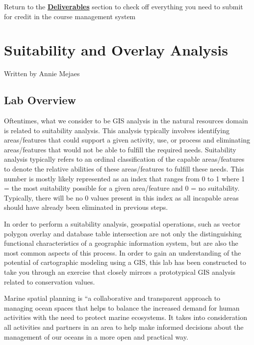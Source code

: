 \documentclass[
]{book}
\begin{document}
Return to the \protect\hyperlink{lab4-deliverables}{\textbf{Deliverables}} section to check off everything you need to submit for credit in the course management system

\hypertarget{suitability-overlay-analysis}{%
\chapter{Suitability and Overlay Analysis}\label{suitability-overlay-analysis}}

Written by
Annie Mejaes

\hypertarget{lab-overview-3}{%
\section*{Lab Overview}\label{lab-overview-3}}

Oftentimes, what we consider to be GIS analysis in the natural resources domain is related to suitability analysis. This analysis typically involves identifying areas/features that could support a given activity, use, or process and eliminating areas/features that would not be able to fulfill the required needs. Suitability analysis typically refers to an ordinal classification of the capable areas/features to denote the relative abilities of these areas/features to fulfill these needs. This number is mostly likely represented as an index that ranges from 0 to 1 where 1 = the most suitability possible for a given area/feature and 0 = no suitability. Typically, there will be no 0 values present in this index as all incapable areas should have already been eliminated in previous steps.

In order to perform a suitability analysis, geospatial operations, such as vector polygon overlay and database table intersection are not only the distinguishing functional characteristics of a geographic information system, but are also the most common aspects of this process. In order to gain an understanding of the potential of cartographic modeling using a GIS, this lab has been constructed to take you through an exercise that closely mirrors a prototypical GIS analysis related to conservation values.

Marine spatial planning is ``a collaborative and transparent approach to managing ocean spaces that helps to balance the increased demand for human activities with the need to protect marine ecosystems. It takes into consideration all activities and partners in an area to help make informed decisions about the management of our oceans in a more open and practical way.
\end{document}
